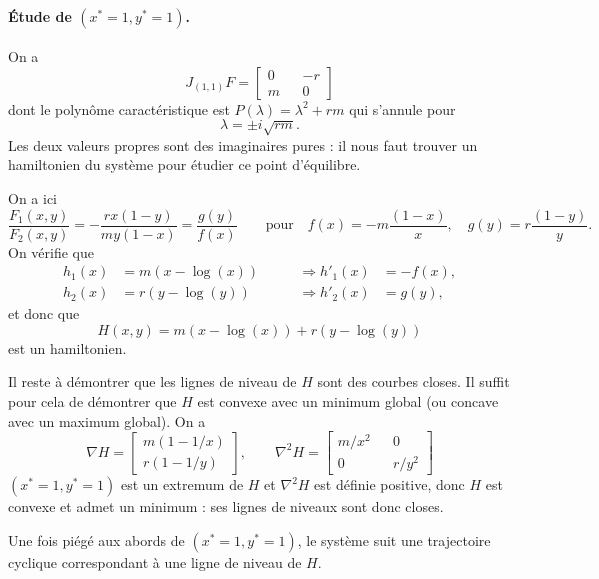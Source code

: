 \paragraph*{\'Etude de $(x^* = 1, y^* = 1)$.}
On a 
$$
J_{(1, 1)}F = 
  \left[\begin{array}{ccc} 
    0 & & -r  \\
    m  & & 0
  \end{array}\right]
$$
dont le polynôme caractéristique est $P(\lambda) = \lambda^2 + rm$ qui s'annule pour
$$
\lambda = \pm i \sqrt{rm}.
$$
Les deux valeurs propres sont des imaginaires pures : il nous faut trouver un hamiltonien du système pour étudier ce point d'équilibre.

\bigskip
On a ici
$$
\frac{F_1(x, y)}{F_2(x, y)} = -\frac{rx(1-y)}{my(1-x)} = \frac{g(y)}{f(x)}
\qquad \text{pour} \quad
f(x) = -m \frac{(1-x)}{x}, \quad
g(y) = r \frac{(1-y)}{y}.
$$
On vérifie que
\begin{align*}
  h_1(x) & = m(x-\log(x)) & \qquad \Rightarrow h'_1(x) & = -f(x), \\
  h_2(x) & = r(y-\log(y)) & \qquad \Rightarrow h'_2(x) & = g(y),
\end{align*}
et donc que 
$$
H(x, y) = m(x-\log(x)) + r(y-\log(y))
$$
est un hamiltonien.

\bigskip
Il reste à démontrer que les lignes de niveau de $H$ sont des courbes closes. Il suffit pour cela de démontrer que $H$ est convexe avec un minimum global (ou concave avec un maximum global). On a
$$
\nabla H = \left[\begin{array}{c} m(1 - 1/x) \\ r(1 - 1/y)\end{array}\right], 
\qquad 
\nabla^2 H = \left[\begin{array}{ccc} m/x^2 & & 0 \\ 0 & & r/y^2 \end{array}\right] 
$$
$(x^* = 1, y^*=1)$ est un extremum de $H$ et $\nabla^2 H$ est définie positive, donc $H$ est convexe et admet un minimum : ses lignes de niveaux sont donc closes.

\bigskip
Une fois piégé aux abords de $(x^* = 1, y^*=1)$, le système suit une trajectoire cyclique 
correspondant à une ligne de niveau de $H$.


